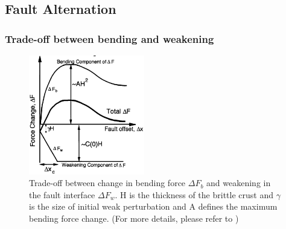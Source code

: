 \subsection{Fault Alternation}

\subsubsection{Trade-off between bending and weakening}

\begin{figure}[h]
 \centering
  \includegraphics[width=0.45\textwidth]{./Figures/fig_Results_Weakening_1_tradeOff_bend_weak.png}
 \caption{Trade-off between change in bending force $\Delta F_{b}$ and weakening in the fault interface $\Delta F_{w}$. H is the thickness of the brittle crust and $\gamma$ is the size of initial weak perturbation and A defines the maximum bending force change. (For more details, please refer to \citep{Lavier2000})}
 \label{fig_Results_Weakening_1}
\end{figure}

